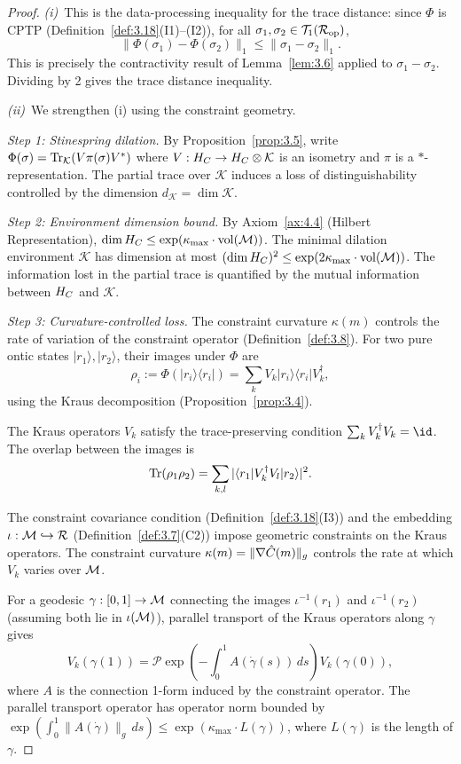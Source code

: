 \begin{proof}
\textit{(i)}~This is the data-processing inequality for the trace
distance: since $\Phi$ is CPTP
(Definition~\ref{def:3.18}(I1)--(I2)), for all
$\sigma_1, \sigma_2 \in \mathcal{T}_1(\mathcal{R}_{\mathrm{op}})$,
\[
  \|\Phi(\sigma_1) - \Phi(\sigma_2)\|_1
  \leq \|\sigma_1 - \sigma_2\|_1.
\]
This is precisely the contractivity result of Lemma~\ref{lem:3.6}
applied to $\sigma_1 - \sigma_2$.  Dividing by 2 gives the trace
distance inequality.

\textit{(ii)}~We strengthen (i) using the constraint geometry.

\textit{Step 1: Stinespring dilation.}
By Proposition~\ref{prop:3.5}, write
$\Phi(\sigma) = \mathrm{Tr}_\mathcal{K}(V\pi(\sigma)V^*)$
where $V : H_C \to H_C \otimes \mathcal{K}$ is an isometry and $\pi$
is a $*$-representation.  The partial trace over $\mathcal{K}$ induces
a loss of distinguishability controlled by the dimension
$d_\mathcal{K} = \dim\mathcal{K}$.

\textit{Step 2: Environment dimension bound.}
By Axiom~\ref{ax:4.4} (Hilbert Representation),
$\dim H_C \leq \exp(\kappa_{\max} \cdot \mathrm{vol}(\mathcal{M}))$.
The minimal dilation environment $\mathcal{K}$ has dimension at most
$(\dim H_C)^2 \leq \exp(2\kappa_{\max} \cdot \mathrm{vol}(\mathcal{M}))$.
The information lost in the partial trace is quantified by the
mutual information between $H_C$ and $\mathcal{K}$.

\textit{Step 3: Curvature-controlled loss.}
The constraint curvature $\kappa(m)$ controls the rate of variation of
the constraint operator (Definition~\ref{def:3.8}).  For two pure ontic
states $|r_1\rangle, |r_2\rangle$, their images under $\Phi$ are
\[
  \rho_i := \Phi(|r_i\rangle\langle r_i|)
  = \sum_k V_k |r_i\rangle\langle r_i| V_k^\dagger,
\]
using the Kraus decomposition (Proposition~\ref{prop:3.4}).

The Kraus operators $V_k$ satisfy the trace-preserving condition
$\sum_k V_k^\dagger V_k = \id$.  The overlap between the images is
\[
  \mathrm{Tr}(\rho_1 \rho_2) = \sum_{k,l}
  |\langle r_1|V_k^\dagger V_l|r_2\rangle|^2.
\]

The constraint covariance condition
(Definition~\ref{def:3.18}(I3)) and the embedding $\iota : \mathcal{M}
\hookrightarrow \mathcal{R}$ (Definition~\ref{def:3.7}(C2)) impose geometric
constraints on the Kraus operators.  The constraint curvature
$\kappa(m) = \|\nabla\hat{C}(m)\|_g$ controls the rate at which
$V_k$ varies over $\mathcal{M}$.

For a geodesic $\gamma : [0,1] \to \mathcal{M}$ connecting the images
$\iota^{-1}(r_1)$ and $\iota^{-1}(r_2)$ (assuming both lie in
$\iota(\mathcal{M})$), parallel transport of the Kraus operators along $\gamma$
gives
\[
  V_k(\gamma(1)) = \mathcal{P}\exp\!\left(
    -\int_0^1 A(\dot\gamma(s))\,ds
  \right) V_k(\gamma(0)),
\]
where $A$ is the connection 1-form induced by the constraint operator.
The parallel transport operator has operator norm bounded by
$\exp(\int_0^1 \|A(\dot\gamma)\|_g\,ds)
\leq \exp(\kappa_{\max} \cdot L(\gamma))$,
where $L(\gamma)$ is the length of $\gamma$.


\end{proof}
